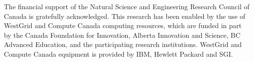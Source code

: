 \documentclass[preprint,aps,prb,floatfix]{revtex4-1}
\begin{document}
 
\begin{acknowledgments}
The financial support of the Natural Science and Engineering Research Council of Canada is gratefully acknowledged. This research has been enabled by the use of WestGrid and Compute Canada computing resources, which are funded in part by the Canada Foundation for Innovation, Alberta Innovation and Science, BC Advanced Education, and the participating research institutions. WestGrid and Compute Canada equipment is provided by IBM, Hewlett Packard and SGI.
\end{acknowledgments}

\clearpage

\end{document}
